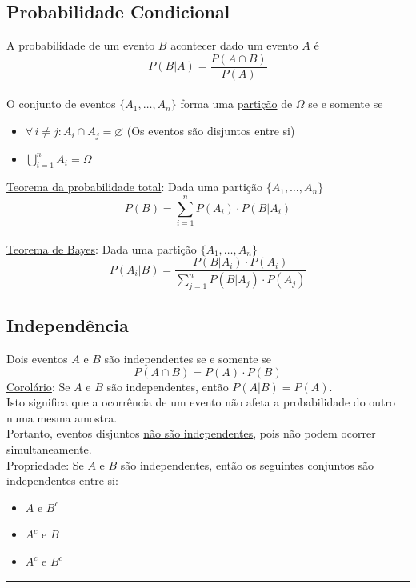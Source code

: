 \documentclass{article}
\begin{document}
\subsection{Probabilidade Condicional}
A probabilidade de um evento $B$ acontecer dado um evento $A$ é
\[ P(B|A) = \frac{P(A \cap B)}{P(A)} \] \\
O conjunto de eventos $\{ A_1, \hdots, A_n \}$ forma uma \uline{partição} de $\Omega$ se e somente se
\begin{itemize}
  \item $\forall \, i \neq j: A_i \cap A_j = \varnothing$ \quad (Os eventos são disjuntos entre si)
  \item $\bigcup\limits_{i=1}^{n} A_i = \Omega$
\end{itemize}
\vspace{5pt}
\uline{Teorema da probabilidade total}: Dada uma partição $\{ A_1, \hdots, A_n \}$
\[ P(B) = \sum_{i = 1}^{n} P(A_i) \cdot P(B|A_i) \] \\
\uline{Teorema de Bayes}: Dada uma partição $\{ A_1, \hdots, A_n \}$
\[ P(A_i|B) = \frac{P(B|A_i) \cdot P(A_i)}{\sum\limits_{j=1}^{n} P(B|A_j) \cdot P(A_j)} \]


\subsection{Independência}
Dois eventos $A$ e $B$ são independentes se e somente se
\[ P(A \cap B) = P(A) \cdot P(B) \]
\uline{Corolário}: Se $A$ e $B$ são independentes, então $P(A|B) = P(A)$. \\[10pt]
Isto significa que a ocorrência de um evento não afeta a probabilidade do outro numa mesma amostra. \\
Portanto, eventos disjuntos \uline{não são independentes}, pois não podem ocorrer simultaneamente. \\[10pt]
Propriedade: Se $A$ e $B$ são independentes, então os seguintes conjuntos são independentes entre si:
\begin{itemize}
  \item $A$ e $B^c$
  \item $A^c$ e $B$
  \item $A^c$ e $B^c$
\end{itemize}

\hrule
\end{document}
